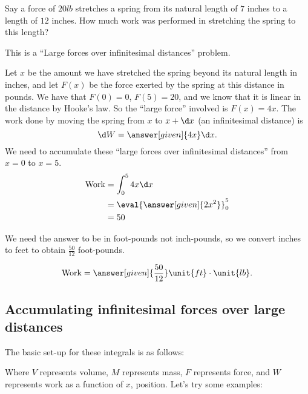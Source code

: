 \documentclass{ximera}
\begin{document}
\begin{example}
  Say a force of $20\unit{lb}$ stretches a spring from its natural
  length of $7$ inches to a length of $12$ inches. How much work was
  performed in stretching the spring to this length?
  \begin{explanation}
    \begin{hint}
      This is a ``Large forces over infinitesimal distances'' problem.
    \end{hint}
    Let $x$ be the amount we have stretched the spring beyond its
    natural length in inches, and let $F(x)$ be the force exerted by
    the spring at this distance in pounds.  We have that $F(0)=0$,
    $F(5) = 20$, and we know that it is linear in the distance by
    Hooke's law.  So the ``large force'' involved is $F(x) = 4x$.  The
    work done by moving the spring from $x$ to $x+\d x$ (an
    infinitesimal distance) is
    \[
    \d W = \answer[given]{4x} \d x.
    \]
    We need to accumulate these ``large forces over infinitesimal
    distances'' from $x=0$ to $x=5$.
    \begin{align*}
      \mathrm{Work} &= \int_0^5 4x \d x\\
      &= \eval{\answer[given]{2x^2}}_0^5\\
      &=50
    \end{align*}
  \begin{hint}
    We need the answer to be in foot-pounds not inch-pounds, so we convert
    inches to feet to obtain $\frac{50}{12}$ foot-pounds.
  \end{hint}
    \[
    \mathrm{Work} = \answer[given]{\frac{50}{12}} \unit{ft}\cdot\unit{lb}.
    \]
  \end{explanation}
\end{example}







\subsection{Accumulating infinitesimal forces over large distances}

The basic set-up for these integrals is as follows:
  \begin{image}
  \end{image}
  Where $V$ represents volume, $M$ represents mass, $F$ represents
  force, and $W$ represents work as a function of $x$, position.
  Let's try some examples:
  
\end{document}
